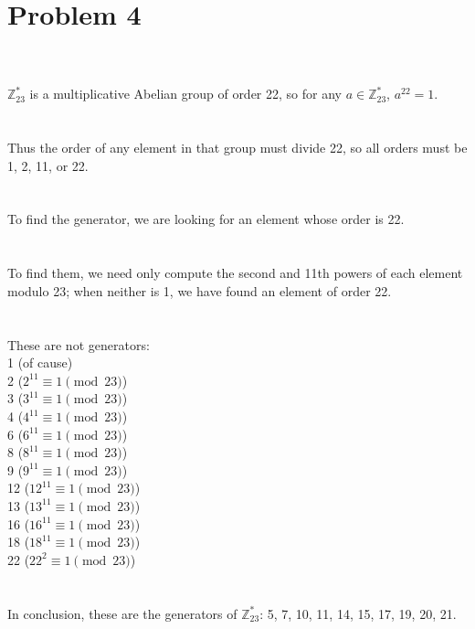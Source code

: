 \documentclass{article}
\begin{document}
\section{Problem 4}
\\ \hspace*{\fill} \\
$\mathbb{Z}_{23}^{*}$ is a multiplicative Abelian group of order 22, so for any $a \in \mathbb{Z}_{23}^{*}$, $a^{22} = 1$.\\
\\ \hspace*{\fill} \\
Thus the order of any element in that group must divide 22, so all orders must be 1, 2, 11, or 22. \\
\\ \hspace*{\fill} \\
To find the generator, we are looking for an element whose order is 22.\\
\\ \hspace*{\fill} \\
To find them, we need only compute the second and 11th powers of each element modulo 23; when neither is 1, we have found an element of order 22.\\
\\ \hspace*{\fill} \\
These are not generators:\\
1 (of cause)\\
2 ($2^{11} \equiv 1 \pmod{23}$)\\
3 ($3^{11} \equiv 1 \pmod{23}$)\\
4 ($4^{11} \equiv 1 \pmod{23}$)\\
6 ($6^{11} \equiv 1 \pmod{23}$)\\
8 ($8^{11} \equiv 1 \pmod{23}$)\\
9 ($9^{11} \equiv 1 \pmod{23}$)\\
12 ($12^{11} \equiv 1 \pmod{23}$)\\
13 ($13^{11} \equiv 1 \pmod{23}$)\\
16 ($16^{11} \equiv 1 \pmod{23}$)\\
18 ($18^{11} \equiv 1 \pmod{23}$)\\
22 ($22^2 \equiv 1 \pmod{23}$)\\
\\ \hspace*{\fill} \\
In conclusion, these are the generators of $\mathbb{Z}_{23}^{*}$: 5, 7, 10, 11, 14, 15, 17, 19, 20, 21.\\
\end{document}
